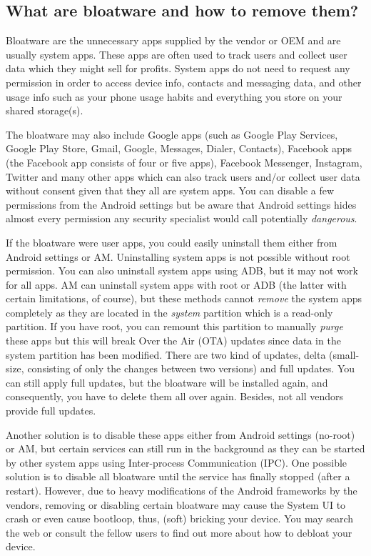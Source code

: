 \subsection{What are bloatware and how to remove them?}\label{subsec:faq:what-are-bloatware} %
Bloatware are the unnecessary apps supplied by the vendor or OEM and are usually system apps. These apps are often used
to track users and collect user data which they might sell for profits. System apps do not need to request any
permission in order to access device info, contacts and messaging data, and other usage info such as your phone usage
habits and everything you store on your shared storage(s).

The bloatware may also include Google apps (such as Google Play Services, Google Play Store, Gmail, Google, Messages,
Dialer, Contacts), Facebook apps (the Facebook app consists of four or five apps), Facebook Messenger, Instagram,
Twitter and many other apps which can also track users and/or collect user data without consent given that they all are
system apps. You can disable a few permissions from the Android settings but be aware that Android settings hides almost
every permission any security specialist would call potentially \emph{dangerous}.

If the bloatware were user apps, you could easily uninstall them either from Android settings or AM. Uninstalling system
apps is not possible without root permission. You can also uninstall system apps using ADB, but it may not work for all
apps. AM can uninstall system apps with root or ADB (the latter with certain limitations, of course), but these methods
cannot \emph{remove} the system apps completely as they are located in the \emph{system} partition which is a read-only
partition. If you have root, you can remount this partition to manually \emph{purge} these apps but this will break Over
the Air (OTA) updates since data in the system partition has been modified. There are two kind of updates, delta
(small-size, consisting of only the changes between two versions) and full updates. You can still apply full updates,
but the bloatware will be installed again, and consequently, you have to delete them all over again. Besides, not all
vendors provide full updates.

Another solution is to disable these apps either from Android settings (no-root) or AM, but certain services can still
run in the background as they can be started by other system apps using Inter-process Communication (IPC). One possible
solution is to disable all bloatware until the service has finally stopped (after a restart). However, due to heavy
modifications of the Android frameworks by the vendors, removing or disabling certain bloatware may cause the System UI
to crash or even cause bootloop, thus, (soft) bricking your device. You may search the web or consult the fellow users
to find out more about how to debloat your device.

